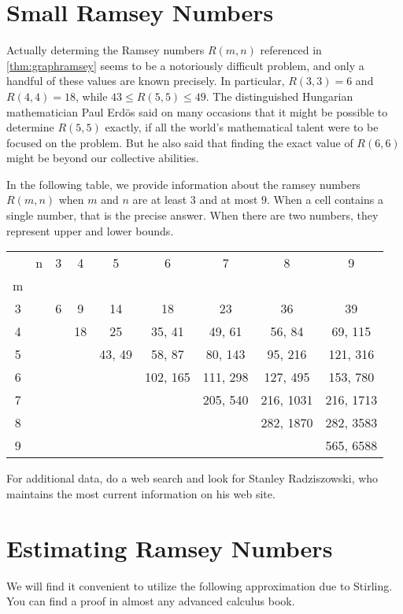 \section{Small Ramsey Numbers}\label{s:ramsey:small}

Actually determing the Ramsey numbers $R(m,n)$ referenced in \autoref{thm:graphramsey}
seems to be a notoriously difficult problem, and only a handful of these
values are known precisely.  In particular, $R(3,3)=6$ and $R(4,4)=18$, while
$43\le R(5,5)\le 49$.  The distinguished Hungarian mathematician
Paul Erd\"os said on many occasions that it might be possible
to determine $R(5,5)$ exactly, if all the world's mathematical
talent were to be focused on the problem.  But he also said that
finding the exact value of $R(6,6)$ might be beyond our collective
abilities.

In the following table, we provide information about
the ramsey numbers $R(m,n)$ when $m$ and $n$ are at least $3$ and at
most $9$.   When a cell contains a single number, that
is the precise answer.  When there are two numbers, they
represent upper and lower bounds.

\begin{center}
\begin{tabular}{||cc||c|c|c|c|c|c|c||}
\hline\hline
&n&3&4&5&6&7&8&9\\
m&&&&&&&&\\
\hline\hline
3&&6&9&14&18&23&36&39\\
4&&&18&25&35, 41&49, 61&56, 84&69, 115\\
5&&&&43, 49&58, 87&80, 143&95, 216&121, 316\\
6&&&&&102, 165&111, 298&127, 495&153, 780\\
7&&&&&&205, 540&216, 1031&216, 1713\\
8&&&&&&&282, 1870&282, 3583\\
9&&&&&&&&565, 6588\\
\hline\hline
\end{tabular}
\end{center}

For additional data, do a web search and look for
Stanley Radziszowski, who maintains the most current information
on his web site.

\section{Estimating Ramsey Numbers}\label{s:ramsey:estimatesize}

We will find it convenient to utilize the following approximation
due to Stirling.  You can find a proof in almost any
advanced calculus book.

